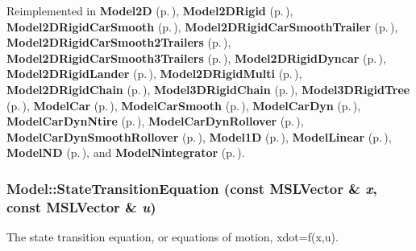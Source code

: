 Reimplemented in {\bf Model2D} {\rm (p.\,\pageref{classModel2D_a2})}, {\bf Model2DRigid} {\rm (p.\,\pageref{classModel2DRigid_a6})}, {\bf Model2DRigid\-Car\-Smooth} {\rm (p.\,\pageref{classModel2DRigidCarSmooth_a5})}, {\bf Model2DRigid\-Car\-Smooth\-Trailer} {\rm (p.\,\pageref{classModel2DRigidCarSmoothTrailer_a4})}, {\bf Model2DRigid\-Car\-Smooth2Trailers} {\rm (p.\,\pageref{classModel2DRigidCarSmooth2Trailers_a4})}, {\bf Model2DRigid\-Car\-Smooth3Trailers} {\rm (p.\,\pageref{classModel2DRigidCarSmooth3Trailers_a4})}, {\bf Model2DRigid\-Dyncar} {\rm (p.\,\pageref{classModel2DRigidDyncar_a3})}, {\bf Model2DRigid\-Lander} {\rm (p.\,\pageref{classModel2DRigidLander_a3})}, {\bf Model2DRigid\-Multi} {\rm (p.\,\pageref{classModel2DRigidMulti_a3})}, {\bf Model2DRigid\-Chain} {\rm (p.\,\pageref{classModel2DRigidChain_a2})}, {\bf Model3DRigid\-Chain} {\rm (p.\,\pageref{classModel3DRigidChain_a3})}, {\bf Model3DRigid\-Tree} {\rm (p.\,\pageref{classModel3DRigidTree_a3})}, {\bf Model\-Car} {\rm (p.\,\pageref{classModelCar_a2})}, {\bf Model\-Car\-Smooth} {\rm (p.\,\pageref{classModelCarSmooth_a2})}, {\bf Model\-Car\-Dyn} {\rm (p.\,\pageref{classModelCarDyn_a2})}, {\bf Model\-Car\-Dyn\-Ntire} {\rm (p.\,\pageref{classModelCarDynNtire_a2})}, {\bf Model\-Car\-Dyn\-Rollover} {\rm (p.\,\pageref{classModelCarDynRollover_a4})}, {\bf Model\-Car\-Dyn\-Smooth\-Rollover} {\rm (p.\,\pageref{classModelCarDynSmoothRollover_a3})}, {\bf Model1D} {\rm (p.\,\pageref{classModel1D_a2})}, {\bf Model\-Linear} {\rm (p.\,\pageref{classModelLinear_a2})}, {\bf Model\-ND} {\rm (p.\,\pageref{classModelND_a2})}, and {\bf Model\-Nintegrator} {\rm (p.\,\pageref{classModelNintegrator_a2})}.
\subsubsection{ Model::State\-Transition\-Equation (const {\bf MSLVector} \& {\em x}, const {\bf MSLVector} \& {\em u})\hspace{0.3cm}{\tt  [pure virtual]}}\label{classModel_a3}


The state transition equation, or equations of motion, xdot=f(x,u).



